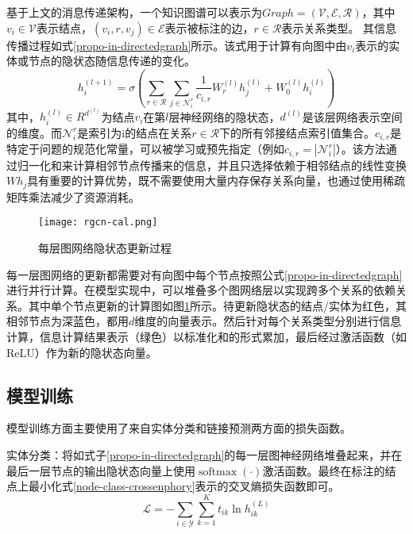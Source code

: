 基于上文的消息传递架构，一个知识图谱可以表示为$Graph=\left(\mathcal{V},\mathcal{E},\mathcal{R}\right)$，其中$v_i\in\mathcal{V}$表示结点，$\left(v_i,r,v_j\right)\in\mathcal{E}$表示被标注的边，$r\in\mathcal{R}$表示关系类型。
其信息传播过程如式\ref{propo-in-directedgraph}所示。该式用于计算有向图中由$v_{i}$表示的实体或节点的隐状态随信息传递的变化。
\begin{equation}
    h_{i}^{(l+1)}=\sigma\left(\sum_{r \in \mathcal{R}} \sum_{j \in \mathcal{N}_{i}^{r}} \frac{1}{c_{i, r}} W_{r}^{(l)} h_{j}^{(l)}+W_{0}^{(l)} h_{i}^{(l)}\right)
    \label{propo-in-directedgraph}
\end{equation}
其中，$h_i^{\left(l\right)}\in R^{d^{\left(l\right)}}$为结点$v_i$在第$l$层神经网络的隐状态，$d^{\left(l\right)}$是该层网络表示空间的维度。而$\mathcal{N}_{i}^{r}$是索引为i的结点在关系$r\in\mathcal{R}$下的所有邻接结点索引值集合。$c_{i,r}$是特定于问题的规范化常量，可以被学习或预先指定（例如$c_{i, r}=\left|\mathcal{N}_{i}^{r}\right|$）。该方法通过归一化和来计算相邻节点传播来的信息，并且只选择依赖于相邻结点的线性变换$Wh_j$具有重要的计算优势，既不需要使用大量内存保存关系向量，也通过使用稀疏矩阵乘法减少了资源消耗。

\begin{figure}[htbp]
    \centering
    \texttt{[image: rgcn-cal.png]}
    \caption{每层图网络隐状态更新过程\label{rgcn-cal}}
\end{figure}

每一层图网络的更新都需要对有向图中每个节点按照公式\ref{propo-in-directedgraph}进行并行计算。在模型实现中，可以堆叠多个图网络层以实现跨多个关系的依赖关系。其中单个节点更新的计算图如图\ref{rgcn-cal}所示。待更新隐状态的结点/实体为红色，其相邻节点为深蓝色，都用$d$维度的向量表示。然后针对每个关系类型分别进行信息计算，信息计算结果表示（绿色）以标准化和的形式累加，最后经过激活函数（如ReLU）作为新的隐状态向量。

\subsection{模型训练}
模型训练方面主要使用了来自实体分类和链接预测两方面的损失函数。

实体分类：将如式子\ref{propo-in-directedgraph}的每一层图神经网络堆叠起来，并在最后一层节点的输出隐状态向量上使用$\operatorname{softmax}(\cdot)$激活函数。最终在标注的结点上最小化式\ref{node-class-crossenphory}表示的交叉熵损失函数即可。
\begin{equation}
    \mathcal{L}=-\sum_{i \in \mathcal{Y}} \sum_{k=1}^{K} t_{i k} \ln h_{i k}^{(L)}
    \label{node-class-crossenphory}
\end{equation}

